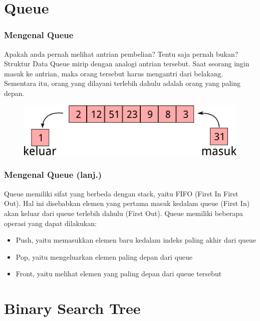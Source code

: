 \section{Queue}
\frame{\sectionpage}

\begin{frame}
\frametitle{Mengenal Queue}

Apakah anda pernah melihat antrian pembelian? Tentu saja pernah bukan?
\newline
\newline
Struktur Data Queue mirip dengan analogi antrian tersebut. Saat seorang ingin masuk ke antrian, maka orang tersebut harus mengantri dari belakang. Sementara itu, orang yang dilayani terlebih dahulu adalah orang yang paling depan.

\begin{figure}
  \centering
  \includegraphics[width=8 cm]{asset/queue.png}
\end{figure}
\end{frame}

\begin{frame}
\frametitle{Mengenal Queue (lanj.)}

Queue memiliki sifat yang berbeda dengan stack, yaitu FIFO (First In First Out). Hal ini disebabkan elemen yang pertama masuk kedalam queue (First In) akan keluar dari queue terlebih dahulu (First Out).\newline\newline
Queue memiliki beberapa operasi yang dapat dilakukan:
\begin{itemize}
  \item Push, yaitu memasukkan elemen baru kedalam indeks paling akhir dari queue
  \item Pop, yaitu mengeluarkan elemen paling depan dari queue
  \item Front, yaitu melihat elemen yang paling depan dari queue tersebut
\end{itemize}
\end{frame}

\section{Binary Search Tree}
\frame{\sectionpage}

